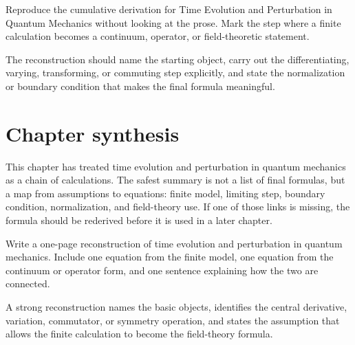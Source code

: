 \begin{exercise}
Reproduce the cumulative derivation for Time Evolution and Perturbation in Quantum Mechanics without looking at the prose.  Mark the step where a finite calculation becomes a continuum, operator, or field-theoretic statement.
\begin{answer}
The reconstruction should name the starting object, carry out the differentiating, varying, transforming, or commuting step explicitly, and state the normalization or boundary condition that makes the final formula meaningful.
\end{answer}
\end{exercise}



\section{Chapter synthesis}

This chapter has treated time evolution and perturbation in quantum mechanics as a chain of calculations.  The safest summary is not a list of final formulas, but a map from assumptions to equations: finite model, limiting step, boundary condition, normalization, and field-theory use.  If one of those links is missing, the formula should be rederived before it is used in a later chapter.

\begin{exercise}
Write a one-page reconstruction of time evolution and perturbation in quantum mechanics.  Include one equation from the finite model, one equation from the continuum or operator form, and one sentence explaining how the two are connected.
\begin{answer}
A strong reconstruction names the basic objects, identifies the central derivative, variation, commutator, or symmetry operation, and states the assumption that allows the finite calculation to become the field-theory formula.
\end{answer}
\end{exercise}
